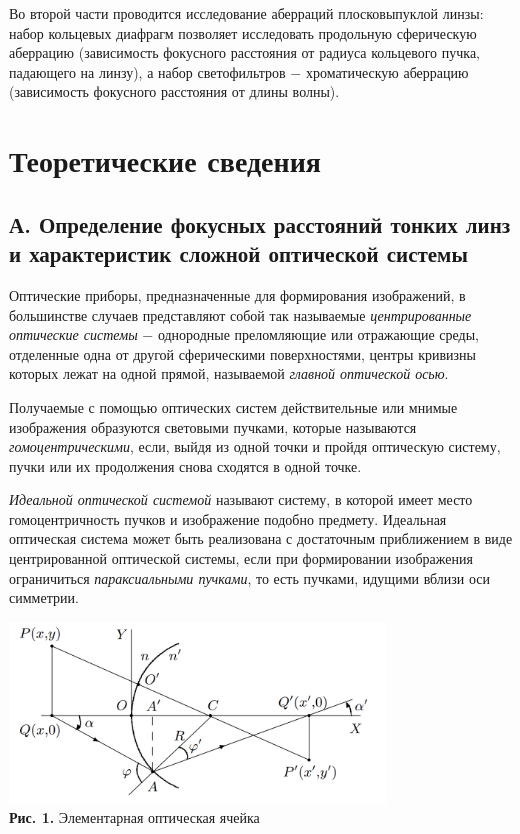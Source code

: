 \documentclass[a4paper,12pt]{article} %
\begin{document}
\hfill \break Во второй части проводится исследование аберраций плосковыпуклой линзы: набор кольцевых диафрагм позволяет исследовать продольную сферическую аберрацию (зависимость фокусного расстояния от радиуса кольцевого пучка, падающего на линзу), а набор светофильтров $-$ хроматическую аберрацию (зависимость фокусного расстояния от длины волны).

\section{Теоретические сведения}

\subsection*{А. Определение фокусных расстояний тонких линз и характеристик сложной оптической системы}

\hfill \break Оптические приборы, предназначенные для формирования изображений, в большинстве случаев представляют собой так называемые \textit{центрированные оптические системы} $-$ однородные преломляющие или отражающие среды, отделенные одна от другой сферическими поверхностями, центры кривизны которых лежат на одной прямой, называемой \textit{главной оптической осью}.

\hfill \break Получаемые с помощью оптических систем действительные или мнимые изображения образуются световыми пучками, которые называются \textit{гомоцентрическими}, если, выйдя из одной точки и пройдя оптическую систему, пучки или их продолжения снова сходятся в одной точке.

\hfill \break \textit{Идеальной оптической системой} называют систему, в которой имеет место гомоцентричность пучков и изображение подобно предмету. Идеальная оптическая система может быть реализована с достаточным приближением в виде центрированной оптической системы, если при формировании изображения ограничиться \textit{параксиальными пучками}, то есть пучками, идущими вблизи оси симметрии.

\begin{center}
\includegraphics[width=0.75\textwidth]{4.1.1_1.png}\\
\textbf{Рис. 1.} Элементарная оптическая ячейка \\
\end{center}
\end{document}
